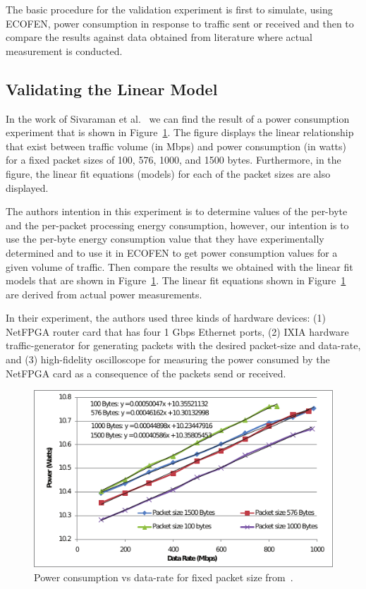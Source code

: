 The basic procedure for the validation experiment is first to simulate, using ECOFEN, power consumption in response to traffic sent or received and then to compare the results against data obtained from literature where actual measurement is conducted.

\subsection{Validating the Linear Model}
In the work of Sivaraman et al.~\cite{Sivaraman} we can find the result of a power consumption experiment that is shown in Figure~\ref{fig:powervsdatarate1}. The figure displays the linear relationship that exist between traffic volume (in Mbps) and power consumption (in watts) for a fixed packet sizes of 100, 576, 1000, and 1500 bytes. Furthermore, in the figure, the linear fit equations (models) for each of the packet sizes are also displayed. 

The authors intention in this experiment is to determine values of the per-byte and the per-packet processing energy consumption, however, our intention is to use the per-byte energy consumption value that they have experimentally determined and to use it in ECOFEN to get power consumption values for a given volume of traffic. Then compare the results we obtained with the linear fit models that are shown in Figure~\ref{fig:powervsdatarate1}. The linear fit equations shown in Figure~\ref{fig:powervsdatarate1} are derived from actual power measurements.

In their experiment, the authors used three kinds of hardware devices: (1) NetFPGA router card that has four 1 Gbps Ethernet ports, (2) IXIA hardware traffic-generator for generating packets with the desired packet-size and data-rate, and (3) high-fidelity oscilloscope for measuring the power consumed by the NetFPGA card as a consequence of the packets send or received. 

\begin{figure}[ht]
	\begin{center}
		\includegraphics[width=13cm]{images/powervsdatarate1.pdf}
		\caption{Power consumption vs data-rate for fixed packet size from~\cite{Sivaraman}.}
		\label{fig:powervsdatarate1}
	\end{center}
\end{figure}

